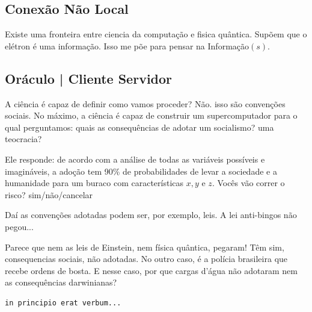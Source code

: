 \documentclass[12pt,a4paper]{article}
\begin{document}
    \subsection{Conex\~ao N\~ao Local}
		\begin{flushright}
		\end{flushright}

 			Existe uma fronteira entre ciencia da computa\c{c}\~ao e fisica qu\^antica. Sup\~oem que o el\'etron \'e uma informa\c{c}\~ao. Isso me p\~oe para pensar na Informa\c{c}\~ao$(s)$.

    \subsection{Or\'aculo | Cliente Servidor}
		\begin{flushright}
		\end{flushright}

A ci\^encia \'e capaz de definir como vamos proceder? N\~ao. isso s\~ao
conven\c{c}\~oes sociais. No m\'aximo, a ci\^encia \'e capaz de construir um
supercomputador para o qual perguntamos: quais as consequ\^encias de
adotar um socialismo? uma teocracia?

Ele responde: de acordo com a an\'alise de todas as vari\'aveis poss\'iveis e
imagin\'aveis, a ado\c{c}\~ao tem 90\% de probabilidades de levar a sociedade e a
 humanidade para um buraco com caracter\'isticas $x, y$ e $z$. Voc\^es v\~ao
correr o risco? sim/n\~ao/cancelar

Da\'i as conven\c{c}\~oes adotadas podem ser, por exemplo, leis. A lei
anti-bingos n\~ao pegou...

Parece que nem as leis de Einstein, nem f\'isica qu\^antica, pegaram! T\^em
sim, consequencias sociais, n\~ao adotadas. No outro caso, \'e a pol\'icia brasileira que recebe ordens de bosta. E nesse caso, por que cargas d'\'agua n\~ao adotaram nem as consequ\^encias darwinianas?

		\begin{flushright}
		\end{flushright}

		\begin{verbatim}
in principio erat verbum...
\end{verbatim}
\end{document}
